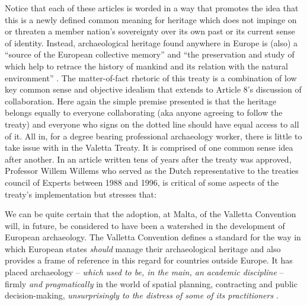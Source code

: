 \documentclass[english]{ijsra}
\begin{document}
Notice that each of these articles is worded in a way that promotes the idea that this is a newly defined common meaning for heritage which does not impinge on or threaten a member nation’s sovereignty over its own past or its current sense of identity. Instead, archaeological heritage found anywhere in Europe is (also) a “source of the European collective memory” and “the preservation and study of which help to retrace the history of mankind and its relation with the natural environment” \parencite[4]{Valetta_1992}. 
The matter-of-fact rhetoric of this treaty is a combination of low key common sense and objective idealism that extends to Article 8’s discussion of collaboration. Here again the simple premise presented is that the heritage belongs equally to everyone collaborating (aka anyone agreeing to follow the treaty) and everyone who signs on the dotted line should have equal access to all of it. All in, for a degree bearing professional archaeology worker, there is little to take issue with in the Valetta Treaty. It is comprised of one common sense idea after another. In an article written tens of years after the treaty was approved, Professor Willem Willems who served as the Dutch representative to the treaties council of Experts between 1988 and 1996, is critical of some aspects of the treaty’s implementation but stresses that:

\begin{displayquote}
	We can be quite certain that the adoption, at Malta, of the Valletta Convention will, in future, be considered to have been a watershed in the development of European archaeology. The Valletta Convention defines a standard for the way in which European states \textit{should} manage their archaeological heritage and also provides a frame of reference in this regard for countries outside Europe. It has placed archaeology – \textit{which used to be, in the main, an academic discipline} – firmly {\textit{and pragmatically}} in the world of spatial planning, contracting and public decision-making, \textit{unsurprisingly to the distress of some of its practitioners} \parencite{Willems_2007}.
\end{displayquote}
\end{document}
